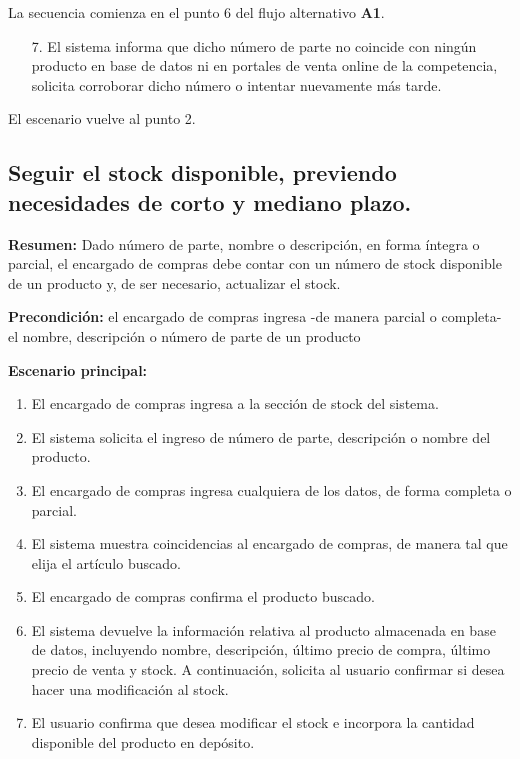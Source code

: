 La secuencia comienza en el punto 6 del flujo alternativo \textbf{A1}.

\begin{enumerate}
	\item [7.] El sistema informa que dicho número de parte no coincide con ningún producto en base de datos ni en portales de venta online de la competencia, 
	solicita corroborar dicho número o intentar nuevamente más tarde.
\end{enumerate}

El escenario vuelve al punto 2.

\pagebreak

\subsection{Seguir el stock disponible, previendo necesidades de corto y mediano plazo.}

\textbf{Resumen:}
Dado número de parte,
nombre o descripción,
en forma íntegra o parcial,
el encargado de compras debe contar con un número de stock disponible de un producto y,
de ser necesario,
actualizar el stock.

\textbf{Precondición:} 
el encargado de compras ingresa -de manera parcial o completa- el nombre, descripción o número de parte de un producto

\textbf{Escenario principal:}
\begin{enumerate}
	\item El encargado de compras ingresa a la sección de stock del sistema.
	\item El sistema solicita el ingreso de número de parte, descripción o nombre del producto.
	\item El encargado de compras ingresa cualquiera de los datos, de forma completa o parcial.
	\item El sistema muestra coincidencias al encargado de compras, de manera tal que elija el artículo buscado.
	\item El encargado de compras confirma el producto buscado.
	\item El sistema devuelve la información relativa al producto almacenada en base de datos,
	incluyendo nombre, descripción, último precio de compra, último precio de venta y stock.
	A continuación, solicita al usuario confirmar si desea hacer una modificación al stock.
	\item El usuario confirma que desea modificar el stock e incorpora la cantidad disponible del producto en depósito.
\end{enumerate}

